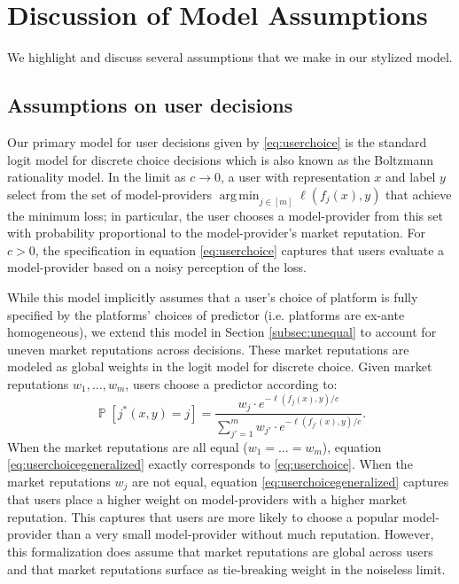 \documentclass[letterpaper,11pt]{article}
\theoremstyle{plain}
\DeclareMathOperator*{\argmin}{arg\,min}
\DeclareMathOperator*{\Prob}{\mathbb{P}}
\begin{document}
\section{Discussion of Model Assumptions}\label{sec:modeldiscussion}  

We highlight and discuss several assumptions that we make in our stylized model. 

\subsection{Assumptions on user decisions}

Our primary model for user decisions given by \eqref{eq:userchoice} is the standard logit model for discrete choice decisions \citep{train2002discrete} which is also known as the Boltzmann rationality model. In the limit as $c \rightarrow 0$, a user with representation $x$ and label $y$ select from the set of model-providers $\argmin_{j \in [m]} \ell(f_j(x), y)$ that achieve the minimum loss; in particular, the user chooses a model-provider from this set with probability proportional to the model-provider's market reputation. For $c > 0$, the specification in equation \eqref{eq:userchoice} captures that users evaluate a model-provider based on a noisy perception of the loss. 

While this model implicitly assumes that a user’s choice of platform is fully specified by the platforms’ choices of predictor (i.e. platforms are ex-ante homogeneous), we extend this model in Section \ref{subsec:unequal} to account for uneven market reputations across decisions. These market reputations are modeled as global weights in the logit model for discrete choice. 
Given market reputations $w_1, \ldots, w_m$, users choose a predictor according to: 
\begin{equation}
\label{eq:userchoicegeneralized}
\Prob[j^*(x,y) = j] = \frac{w_j \cdot e^{- \ell(f_j(x), y) / c}}{\sum_{j'=1}^m w_{j'} \cdot e^{- \ell(f_{j'}(x), y) / c}}.
\end{equation}
When the market reputations are all equal ($w_1 = \ldots = w_m$), equation \eqref{eq:userchoicegeneralized} exactly corresponds to \eqref{eq:userchoice}.  When the market reputations $w_j$ are not equal, equation \eqref{eq:userchoicegeneralized} captures that users place a higher weight on model-providers with a higher market reputation. This captures that users are more likely to choose a popular model-provider than a very small model-provider without much reputation. However, this formalization does assume that market reputations are global across users and that market reputations surface as tie-breaking weight in the noiseless limit.
\end{document}
